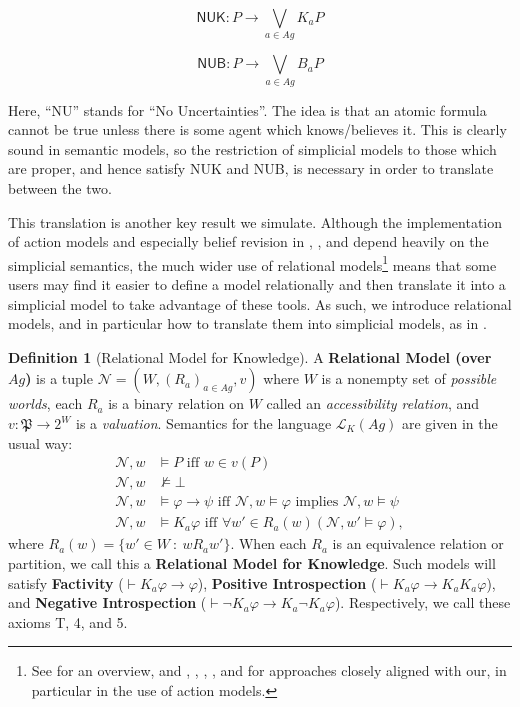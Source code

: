 \documentclass[11pt]{article}
\theoremstyle{definition}
\newtheorem{definition}{Definition}[section]
\newcommand{\defin}[1]{\textbf{#1}}
\renewcommand{\phi}{\varphi}
\newcommand{\lthen}{\rightarrow}
\renewcommand{\L}{\mathcal{L}}
\newcommand{\N}{\mathcal{N}}
\begin{document}
	$$\textsf{NUK}:P\rightarrow\bigvee_{a\in Ag}K_aP$$
	
	$$\textsf{NUB}:P\rightarrow\bigvee_{a\in Ag}B_aP$$
	
	Here, ``NU'' stands for ``No Uncertainties''. The idea is that an atomic formula cannot be true unless there is some agent which knows/believes it. This is clearly sound in semantic models, so the restriction of simplicial models to those which are proper, and hence satisfy \textsf{NUK} and \textsf{NUB}, is necessary in order to translate between the two.
	
	This translation is another key result we simulate. Although the implementation of action models and especially belief revision in \cite{SimpBelRev}, \cite{SimpAct}, and \cite{TechMemo} depend heavily on the simplicial semantics, the much wider use of relational models\footnote{See \cite{DC5} for an overview, and \cite{KaSC}, \cite{KaG}, \cite{ActionDC}, \cite{CPM}, and \cite{CPaAM} for approaches closely aligned with our, in particular in the use of action models.} means that some users may find it easier to define a model relationally and then translate it into a simplicial model to take advantage of these tools. As such, we introduce relational models, and in particular how to translate them into simplicial models, as in \cite{BelSimp}.
	
	\begin{definition}[Relational Model for Knowledge] A \defin{Relational Model (over $Ag$)} is a tuple $\N = (W,(R_{a})_{a \in Ag},v)$ where $W$ is a nonempty set of \emph{possible worlds}, each $R_{a}$ is a binary relation on $W$ called an \emph{accessibility relation}, and $v: \mathfrak{P} \to 2^{W}$ is a \emph{valuation}. Semantics for the language $\L_{K}(Ag)$ are given in the usual way:
	\begin{align*}
		\N,w & \models P \text{ iff } w \in v(P)\\
		\N,w & \nvDash \bot\\
		\N,w & \models \phi \lthen \psi \text{ iff } \N,w \models \phi \text{ implies } \N,w \models \psi\\
		\N,w & \models K_a \phi \text{ iff } \forall w' \in R_{a}(w) (\N,w' \models \phi),
	\end{align*}
	where $R_{a}(w) = \{w' \in W \: : \: wR_{a}w'\}$. When each $R_{a}$ is an equivalence relation or partition, we call this a \defin{Relational Model for Knowledge}. Such models will satisfy \defin{Factivity} ($\vdash K_a\varphi\rightarrow\varphi$), \defin{Positive Introspection} ($\vdash K_a\varphi\rightarrow K_aK_a\varphi$), and \defin{Negative Introspection} ($\vdash \neg K_a\varphi\rightarrow K_a\neg K_a\varphi$). Respectively, we call these axioms \textsf{T}, \textsf{4}, and \textsf{5}.
	\end{definition}
\end{document}
